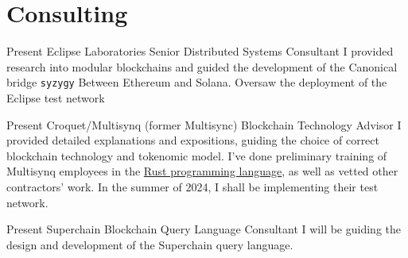\documentclass{CurriculumVitae}[10pt, condensed]
\author{Aleksandr Petrosyan} \date{\today}
\begin{document}
\maketitle



\section*{Consulting}

%
{Present}%
{Eclipse Laboratories}%
{Senior Distributed Systems Consultant}%
{%
  I provided research into modular blockchains and guided the
  development of the Canonical bridge \texttt{syzygy} Between Ethereum
  and Solana.  Oversaw the deployment of the Eclipse test network
}

%
{Present}%
{Croquet/Multisynq (former Multisync)}%
{Blockchain Technology Advisor}%
{%
  I provided detailed explanations and expositions, guiding the choice
  of correct blockchain technology and tokenomic model. I've done
  preliminary training of Multisynq employees in the
  \href{https://github.com/Greybeard-Entertainment/rust}{Rust
    programming language}, as well as vetted other contractors'
  work. In the summer of 2024, I shall be implementing their test
  network.
}%

%
{Present}%
{Superchain}%
{Blockchain Query Language Consultant}%
{
  I will be guiding the design and development of the Superchain query language.
}


\vfill
\end{document}
